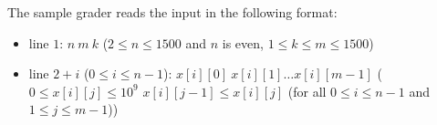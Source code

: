 The sample grader reads the input in the following format:
\begin{itemize}
\item line $1$: $n\ m\ k$ ($2 \leq n \leq 1500$ and $n$ is even, $1 \leq k \leq m \leq 1500$)
\item line $2+i$ ($0\leq i\leq n-1$): $x[i][0]\ x[i][1]\ldots x[i][m-1]$ ($0 \leq x[i][j] \leq 10^9$ $x[i][j-1] \leq x[i][j]$ (for all $0 \leq i \leq n-1$ and $1 \leq j \leq m-1$))
\end{itemize}